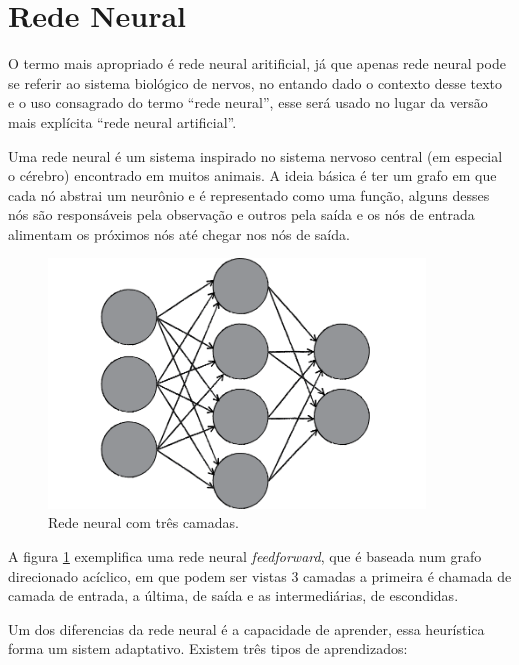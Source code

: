 \section{Rede Neural}

O termo mais apropriado é rede neural aritificial, já que apenas rede
neural pode se referir ao sistema biológico de nervos, no entando dado o
contexto desse texto e o uso consagrado do termo ``rede neural'', esse
será usado no lugar da versão mais explícita ``rede neural artificial''.

Uma rede neural é um sistema inspirado no sistema nervoso central (em
especial o cérebro) encontrado em muitos animais. A ideia básica é ter
um grafo em que cada nó abstrai um neurônio e é representado como uma
função, alguns desses nós são responsáveis pela observação e outros pela
saída e os nós de entrada alimentam os próximos nós até chegar nos nós
de saída. \cite{haykin2001redes}


\begin{figure}[H]
\centering
\includegraphics[width=10cm]{figuras/rede_neural_grafo}
\caption{Rede neural com três camadas.}\label{fig:rede_neural_grafo}
\end{figure}

A figura \ref{fig:rede_neural_grafo} exemplifica uma rede neural \emph{feedforward},
que é baseada num grafo direcionado acíclico, em que podem ser vistas 3 camadas
a primeira é chamada de camada de entrada, a última, de saída e as intermediárias,
de escondidas. \cite{shiffman2012nature}

Um dos diferencias da rede neural é a capacidade de aprender, essa heurística
forma um sistem adaptativo. Existem três tipos de aprendizados:

